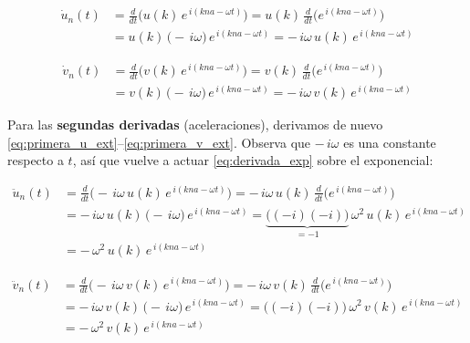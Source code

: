 \documentclass{article}
\begin{document}
\begin{equation}
\begin{split}
\dot{u}_{n}(t) 
&= \frac{d}{dt}\Big(u(k)\,e^{\,i(kna-\omega t)}\Big)
= u(k)\,\frac{d}{dt}\Big(e^{\,i(kna-\omega t)}\Big)\\[4pt]
&= u(k)\,\big(-\,i\omega\big)\,e^{\,i(kna-\omega t)}
= -\,i\omega\,u(k)\,e^{\,i(kna-\omega t)}
\end{split}
\label{eq:primera_u_ext}
\end{equation}

\begin{equation}
\begin{split}
\dot{v}_{n}(t) 
&= \frac{d}{dt}\Big(v(k)\,e^{\,i(kna-\omega t)}\Big)
= v(k)\,\frac{d}{dt}\Big(e^{\,i(kna-\omega t)}\Big)\\[4pt]
&= v(k)\,\big(-\,i\omega\big)\,e^{\,i(kna-\omega t)}
= -\,i\omega\,v(k)\,e^{\,i(kna-\omega t)}
\end{split}
\label{eq:primera_v_ext}
\end{equation}

\vspace{0.35cm}
Para las \textbf{segundas derivadas} (aceleraciones), derivamos de nuevo \eqref{eq:primera_u_ext}–\eqref{eq:primera_v_ext}.
Observa que \(-\,i\omega\) es una constante respecto a \(t\), así que vuelve a actuar \eqref{eq:derivada_exp} sobre el
exponencial:

\begin{equation}
\begin{split}
\ddot{u}_{n}(t) 
&= \frac{d}{dt}\Big(-\,i\omega\,u(k)\,e^{\,i(kna-\omega t)}\Big)
= -\,i\omega\,u(k)\,\frac{d}{dt}\Big(e^{\,i(kna-\omega t)}\Big)\\[4pt]
&= -\,i\omega\,u(k)\,\big(-\,i\omega\big)\,e^{\,i(kna-\omega t)}
= \underbrace{\big((-i)(-i)\big)}_{=-1}\,\omega^{2}\,u(k)\,e^{\,i(kna-\omega t)}\\[4pt]
&= -\,\omega^{2}\,u(k)\,e^{\,i(kna-\omega t)}
\end{split}
\label{eq:segunda_u_ext}
\end{equation}

\begin{equation}
\begin{split}
\ddot{v}_{n}(t) 
&= \frac{d}{dt}\Big(-\,i\omega\,v(k)\,e^{\,i(kna-\omega t)}\Big)
= -\,i\omega\,v(k)\,\frac{d}{dt}\Big(e^{\,i(kna-\omega t)}\Big)\\[4pt]
&= -\,i\omega\,v(k)\,\big(-\,i\omega\big)\,e^{\,i(kna-\omega t)}
= \big((-i)(-i)\big)\,\omega^{2}\,v(k)\,e^{\,i(kna-\omega t)}\\[4pt]
&= -\,\omega^{2}\,v(k)\,e^{\,i(kna-\omega t)}
\end{split}
\label{eq:segunda_v_ext}
\end{equation}
\end{document}
